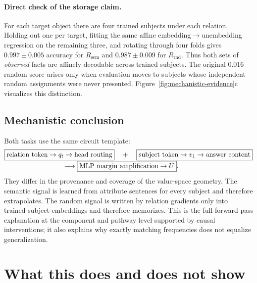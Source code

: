 \documentclass[11pt]{article}
\newcommand{\Rsem}{R_{\mathrm{sem}}}
\newcommand{\Rrnd}{R_{\mathrm{rnd}}}
\begin{document}
\paragraph{Direct check of the storage claim.}
For each target object there are four trained subjects under each relation. Holding out one per target, fitting the same affine embedding$\to$unembedding regression on the remaining three, and rotating through four folds gives $0.997 \pm 0.005$ accuracy for $\Rsem$ and $0.987 \pm 0.009$ for $\Rrnd$. Thus both sets of \emph{observed} facts are affinely decodable across trained subjects. The original $0.016$ random score arises only when evaluation moves to subjects whose independent random assignments were never presented. Figure~\ref{fig:mechanistic-evidence}c visualizes this distinction.

\subsection{Mechanistic conclusion}

Both tasks use the same circuit template:
\begin{align*}
&\boxed{\text{relation token}\to q_t\to\text{head routing}}
\quad+\quad
\boxed{\text{subject token}\to v_1\to\text{answer content}}\\[-1mm]
&\hspace{30mm}\longrightarrow
\boxed{\text{MLP margin amplification}\to U}.
\end{align*}
They differ in the provenance and coverage of the value-space geometry. The semantic signal is learned from attribute sentences for every subject and therefore extrapolates. The random signal is written by relation gradients only into trained-subject embeddings and therefore memorizes. This is the full forward-pass explanation at the component and pathway level supported by causal interventions; it also explains why exactly matching frequencies does not equalize generalization.

\section{What this does and does not show}
\end{document}
